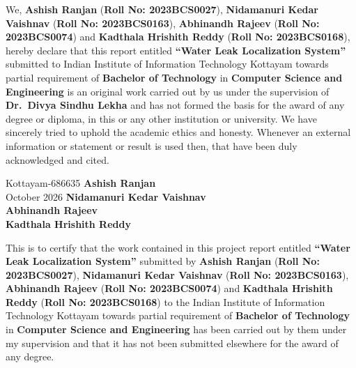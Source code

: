 \documentclass[11pt,letterpaper]{report}
\theoremstyle{definition}
\theoremstyle{plain}
\theoremstyle{remark}
\begin{document}
\begin{center}\vspace*{0.7in}{\large\bfseries DECLARATION}\end{center}
\vspace{0.15in}
{\linespread{1.6}\selectfont
We, \textbf{Ashish Ranjan} (\textbf{Roll No: 2023BCS0027}), \textbf{Nidamanuri Kedar Vaishnav} (\textbf{Roll No: 2023BCS0163}), \textbf{Abhinandh Rajeev} (\textbf{Roll No: 2023BCS0074}) and \textbf{Kadthala Hrishith Reddy} (\textbf{Roll No: 2023BCS0168}), hereby declare that this report entitled \textbf{``Water Leak Localization System''} submitted to Indian Institute of Information Technology Kottayam towards partial requirement of \textbf{Bachelor of Technology} in \textbf{Computer Science and Engineering} is an original work carried out by us under the supervision of \textbf{Dr.\ Divya Sindhu Lekha} and has not formed the basis for the award of any degree or diploma, in this or any other institution or university. We have sincerely tried to uphold the academic ethics and honesty. Whenever an external information or statement or result is used then, that have been duly acknowledged and cited.
}
\vspace{1.1in}

\noindent Kottayam-686635 \hfill \textbf{Ashish Ranjan}\\
October 2026 \hfill \textbf{Nidamanuri Kedar Vaishnav}\\
\mbox{} \hfill \textbf{Abhinandh Rajeev}\\
\mbox{} \hfill \textbf{Kadthala Hrishith Reddy}
\clearpage

\begin{center}\vspace*{0.7in}{\large\bfseries CERTIFICATE}\end{center}
\vspace{0.15in}
{\linespread{1.6}\selectfont
This is to certify that the work contained in this project report entitled \textbf{``Water Leak Localization System''} submitted by \textbf{Ashish Ranjan} (\textbf{Roll No: 2023BCS0027}), \textbf{Nidamanuri Kedar Vaishnav} (\textbf{Roll No: 2023BCS0163}), \textbf{Abhinandh Rajeev} (\textbf{Roll No: 2023BCS0074}) and \textbf{Kadthala Hrishith Reddy} (\textbf{Roll No: 2023BCS0168}) to the Indian Institute of Information Technology Kottayam towards partial requirement of \textbf{Bachelor of Technology} in \textbf{Computer Science and Engineering} has been carried out by them under my supervision and that it has not been submitted elsewhere for the award of any degree.
}
\vspace{0.9in}
\end{document}
